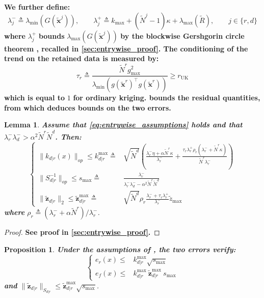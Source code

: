 \documentclass[preprint]{elsarticle}
\newtheorem{proposition}{Proposition}
\newtheorem{lemma}{Lemma}
\begin{document}
\textbf{We further define:}
\begin{equation}
    \lambda_j^-\triangleq\lambda_{\min}(G(\tilde{\mathbf{x}}^j)),\qquad\lambda_j^+\triangleq k_{\max}+(\tilde{N}^j-1)\kappa+\lambda_{\max}(\tilde{R}),\qquad j\in\{r,d\}
\end{equation}
\textbf{where} $\lambda_j^+$ \textbf{bounds} $\lambda_{\max}(G(\tilde{\mathbf{x}}^j))$ \textbf{by the blockwise Gershgorin circle theorem \cite{bib:matrix-analysis}, recalled in \cref{sec:entrywise_proof}. The conditioning of the trend on the retained data is measured by:}
\begin{equation}
    \tau_r\triangleq\frac{\tilde{N}^rg_{\max}^2}{\lambda_{\min}\left(g(\tilde{\mathbf{x}}^r)^\top g(\tilde{\mathbf{x}}^r)\right)}\geq r_{\mathrm{UK}}
\end{equation}
\textbf{which is equal to} $1$ \textbf{for ordinary kriging.  bounds the residual quantities, from which  deduces bounds on the two errors.}

\begin{lemma}
    \textbf{Assume that \eqref{eq:entrywise_assumptions} holds and that} $\lambda_r^-\lambda_d^->\alpha^2\tilde{N}^r\tilde{N}^d$\textbf{. Then:}
    \begin{equation*}
        \left\{\begin{aligned}
        \|k_{d|r}(x)\|_{op}\leq k^{\max}_{d|r}\triangleq&\sqrt{\tilde{N}^d}\left(\frac{\lambda_r^-\eta+\alpha\tilde{N}^r\kappa}{\lambda_r^-}+\frac{\tau_r\lambda_r^+\rho_r(\lambda_r^-+\tilde{N}^r\kappa)}{\tilde{N}^r\lambda_r^-}\right)\\
        \|S_{d|r}^{-1}\|_{op}\leq s_{\max}\triangleq&\frac{\lambda_r^-}{\lambda_r^-\lambda_d^--\alpha^2\tilde{N}^r\tilde{N}^d}\\
        \|\tilde{\mathbf{z}}_{d|r}\|_2\leq\tilde{\mathbf{z}}^{\max}_{d|r}\triangleq&\sqrt{\tilde{N}^d}\rho_r\frac{\lambda_r^-+\tau_r\lambda_r^+}{\lambda_r^-}\tilde{z}_{\max}
        \end{aligned}\right.
    \end{equation*}
    \textbf{where} $\rho_r\triangleq(\lambda_r^-+\alpha\tilde{N}^r)/\lambda_r^-$.\label{th:entrywise_residual}
\end{lemma}

\begin{proof}
    \textbf{See proof in \cref{sec:entrywise_proof}.}
\end{proof}

\begin{proposition}
    \textbf{Under the assumptions of , the two errors verify:}
    \begin{equation*}
        \left\{\begin{aligned}
        e_r(x)\leq&k^{\max}_{d|r}\sqrt{s_{\max}}\\
        e_f(x)\leq&k^{\max}_{d|r}\:\tilde{\mathbf{z}}^{\max}_{d|r}\:s_{\max}
        \end{aligned}\right.
    \end{equation*}
    \textbf{and} $\|\tilde{\mathbf{z}}_{d|r}\|_{S_{d|r}}\leq\tilde{\mathbf{z}}^{\max}_{d|r}\sqrt{s_{\max}}$.\label{th:entrywise_bounds}
\end{proposition}
\end{document}
